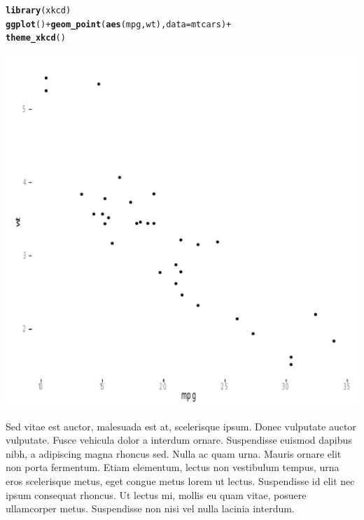 \documentclass[11pt,a4paper]{memoir}\usepackage[]{graphicx}\usepackage[]{color}
\makeatletter
\def\maxwidth{ %
  \ifdim\Gin@nat@width>\linewidth
    \linewidth
  \else
    \Gin@nat@width
  \fi
}
\newcommand{\hlopt}[1]{\textcolor[rgb]{0,0,0}{#1}}%
\newcommand{\hlstd}[1]{\textcolor[rgb]{0.345,0.345,0.345}{#1}}%
\newcommand{\hlkwc}[1]{\textcolor[rgb]{0.333,0.667,0.333}{#1}}%
\newcommand{\hlkwd}[1]{\textcolor[rgb]{0.737,0.353,0.396}{\textbf{#1}}}%
\newenvironment{kframe}{%
 \def\at@end@of@kframe{}%
 \ifinner\ifhmode%
  \def\at@end@of@kframe{\end{minipage}}%
  \begin{minipage}{\columnwidth}%
 \fi\fi%
 \def\FrameCommand##1{\hskip\@totalleftmargin \hskip-\fboxsep
 \colorbox{shadecolor}{##1}\hskip-\fboxsep
     \hskip-\linewidth \hskip-\@totalleftmargin \hskip\columnwidth}%
 \MakeFramed {\advance\hsize-\width
   \@totalleftmargin\z@ \linewidth\hsize
   \@setminipage}}%
 {\par\unskip\endMakeFramed%
 \at@end@of@kframe}
\newenvironment{knitrout}{}{} %
\makeatother
\begin{document}
\begin{knitrout}
\color{fgcolor}\begin{kframe}
\begin{alltt}
\hlkwd{library}\hlstd{(xkcd)}
\hlkwd{ggplot}\hlstd{()} \hlopt{+} \hlkwd{geom_point}\hlstd{(}\hlkwd{aes}\hlstd{(mpg, wt),} \hlkwc{data}\hlstd{=mtcars)} \hlopt{+}
  \hlkwd{theme_xkcd}\hlstd{()}
\end{alltt}
\end{kframe}

{\centering \includegraphics[width=\maxwidth]{figs/xkcd-1} 

}



\end{knitrout}

Sed vitae est auctor, malesuada est at, scelerisque ipsum. Donec vulputate auctor vulputate. Fusce vehicula dolor a interdum ornare. Suspendisse euismod dapibus nibh, a adipiscing magna rhoncus sed. Nulla ac quam urna. Mauris ornare elit non porta fermentum. Etiam elementum, lectus non vestibulum tempus, urna eros scelerisque metus, eget congue metus lorem ut lectus. Suspendisse id elit nec ipsum consequat rhoncus. Ut lectus mi, mollis eu quam vitae, posuere ullamcorper metus. Suspendisse non nisi vel nulla lacinia interdum.
\end{document}
